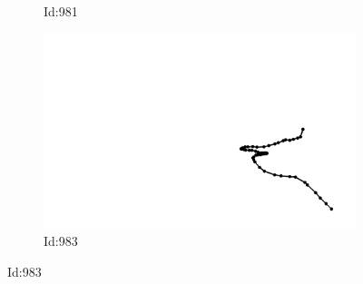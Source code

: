 \documentclass[12pt,twoside]{report}
\begin{document}
\begin{figure}
\begin{subfigure}[b]{0.20\textwidth}
\caption{Id:981}
\end{subfigure}
\begin{subfigure}[b]{0.20\textwidth}
\centering
\includegraphics[width=\textwidth]{../trajectories/983.png}
\caption{Id:983}
\end{subfigure}
\end{figure}
\end{document}
